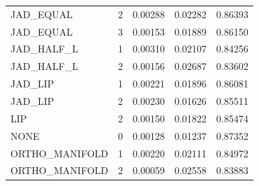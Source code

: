 \begin{table}
\begin{tabular}{lrrrr}
JAD\_EQUAL & 2 & 0.00288 & 0.02282 & 0.86393 \\
JAD\_EQUAL & 3 & 0.00153 & 0.01889 & 0.86150 \\
\hline
JAD\_HALF\_L & 1 & 0.00310 & 0.02107 & 0.84256 \\
JAD\_HALF\_L & 2 & 0.00156 & 0.02687 & 0.83602 \\
\hline
JAD\_LIP & 1 & 0.00221 & 0.01896 & 0.86081 \\
JAD\_LIP & 2 & 0.00230 & 0.01626 & 0.85511 \\
\hline
LIP & 2 & 0.00150 & 0.01822 & 0.85474 \\
\hline
NONE & 0 & 0.00128 & 0.01237 & 0.87352 \\
\hline
ORTHO\_MANIFOLD & 1 & 0.00220 & 0.02111 & 0.84972 \\
ORTHO\_MANIFOLD & 2 & 0.00059 & 0.02558 & 0.83883 \\
\bottomrule
\end{tabular}
\end{table}